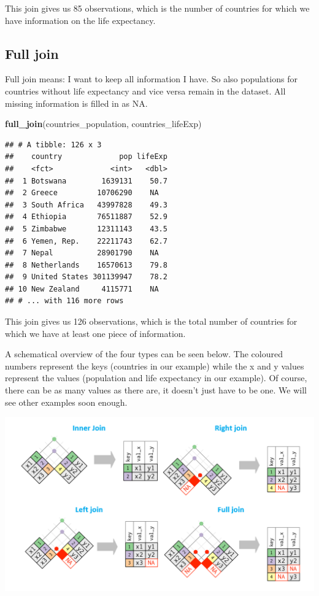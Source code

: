 \documentclass[]{tufte-book}
\newenvironment{Shaded}{}{}
\newcommand{\KeywordTok}[1]{\textcolor[rgb]{0.00,0.44,0.13}{\textbf{#1}}}
\newcommand{\NormalTok}[1]{#1}
\begin{document}
This join gives us 85 observations, which is the number of countries for which we have information on the life expectancy.

\hypertarget{full-join}{%
\subsection{Full join}\label{full-join}}

Full join means: I want to keep all information I have. So also populations for countries without life expectancy and vice versa remain in the dataset. All missing information is filled in as NA.

\begin{Shaded}
\begin{Highlighting}[]
\KeywordTok{full_join}\NormalTok{(countries_population, countries_lifeExp)}
\end{Highlighting}
\end{Shaded}

\begin{verbatim}
## # A tibble: 126 x 3
##    country             pop lifeExp
##    <fct>             <int>   <dbl>
##  1 Botswana        1639131    50.7
##  2 Greece         10706290    NA  
##  3 South Africa   43997828    49.3
##  4 Ethiopia       76511887    52.9
##  5 Zimbabwe       12311143    43.5
##  6 Yemen, Rep.    22211743    62.7
##  7 Nepal          28901790    NA  
##  8 Netherlands    16570613    79.8
##  9 United States 301139947    78.2
## 10 New Zealand     4115771    NA  
## # ... with 116 more rows
\end{verbatim}

This join gives us 126 observations, which is the total number of countries for which we have at least one piece of information.

A schematical overview of the four types can be seen below. The coloured numbers represent the keys (countries in our example) while the x and y values represent the values (population and life expectancy in our example). Of course, there can be as many values as there are, it doesn't just have to be one. We will see other examples soon enough.

\includegraphics[width=1\linewidth]{images/join_types}
\end{document}
